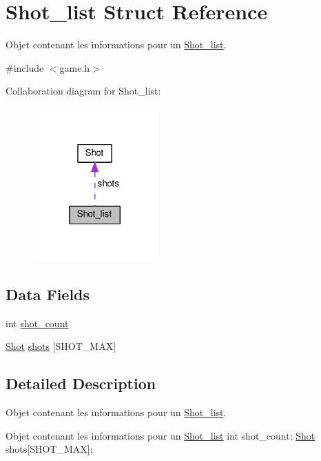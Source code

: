 \hypertarget{struct_shot__list}{}\section{Shot\+\_\+list Struct Reference}
\label{struct_shot__list}


Objet contenant les informations pour un \hyperlink{struct_shot__list}{Shot\+\_\+list}.  




{\ttfamily \#include $<$game.\+h$>$}



Collaboration diagram for Shot\+\_\+list\+:
\nopagebreak
\begin{figure}[H]
\begin{center}
\leavevmode
\includegraphics[width=136pt]{struct_shot__list__coll__graph}
\end{center}
\end{figure}
\subsection*{Data Fields}
\begin{DoxyCompactItemize}
\item 
int \hyperlink{struct_shot__list_a4276a0b800a4ef69dcbfeb381d1e7346}{shot\+\_\+count}
\item 
\hyperlink{struct_shot}{Shot} \hyperlink{struct_shot__list_a08606c51a264817a56f8af413248fa37}{shots} \mbox{[}S\+H\+O\+T\+\_\+\+M\+AX\mbox{]}
\end{DoxyCompactItemize}


\subsection{Detailed Description}
Objet contenant les informations pour un \hyperlink{struct_shot__list}{Shot\+\_\+list}. 

Objet contenant les informations pour un \hyperlink{struct_shot__list}{Shot\+\_\+list} int shot\+\_\+count; \hyperlink{struct_shot}{Shot} shots\mbox{[}S\+H\+O\+T\+\_\+\+M\+AX\mbox{]}; 

